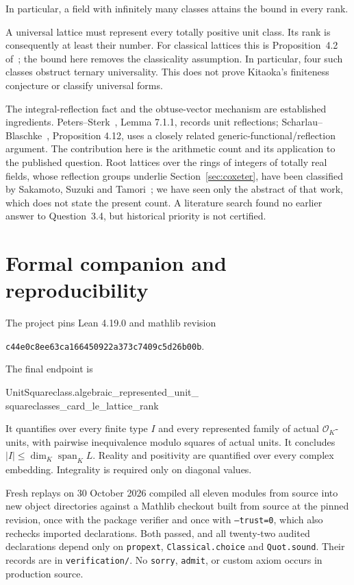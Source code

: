 \documentclass[11pt]{article}
\newcommand{\OK}{\mathcal O_K}
\begin{document}
In particular, a field with infinitely many classes attains the bound in every rank.

A universal lattice must represent every totally positive unit class. Its rank is consequently at least their number. For classical lattices this is Proposition~4.2 of~\cite{DKM}; the bound here removes the classicality assumption. In particular, four such classes obstruct ternary universality. This does not prove Kitaoka's finiteness conjecture or classify universal forms.

The integral-reflection fact and the obtuse-vector mechanism are established ingredients. Peters--Sterk~\cite{PS}, Lemma 7.1.1, records unit reflections; Scharlau--Blaschke~\cite{SB}, Proposition 4.12, uses a closely related generic-functional/reflection argument. The contribution here is the arithmetic count and its application to the published question. Root lattices over the rings of integers of totally real fields, whose reflection groups underlie Section~\ref{sec:coxeter}, have been classified by Sakamoto, Suzuki and Tamori~\cite{SST}; we have seen only the abstract of that work, which does not state the present count. A literature search found no earlier answer to Question~3.4, but historical priority is not certified.

\clearpage
\section{Formal companion and reproducibility}\label{sec:formal}
The project pins Lean 4.19.0 and mathlib revision
\begin{center}\small\texttt{c44e0c8ee63ca166450922a373c7409c5d26b00b}.\end{center}
The final endpoint is
\begin{flushleft}\small\ttfamily
UnitSquareclass.algebraic\_represented\_unit\_\\
squareclasses\_card\_le\_lattice\_rank
\end{flushleft}
It quantifies over every finite type $I$ and every represented family of actual $\OK$-units, with pairwise inequivalence modulo squares of actual units. It concludes $|I|\leq\dim_K\operatorname{span}_K L$. Reality and positivity are quantified over every complex embedding. Integrality is required only on diagonal values.

Fresh replays on 30 October 2026 compiled all eleven modules from source into new object directories against a Mathlib checkout built from source at the pinned revision, once with the package verifier and once with \texttt{--trust=0}, which also rechecks imported declarations. Both passed, and all twenty-two audited declarations depend only on \texttt{propext}, \texttt{Classical.choice} and \texttt{Quot.sound}. Their records are in \texttt{verification/}. No \texttt{sorry}, \texttt{admit}, or custom axiom occurs in production source.
\end{document}
